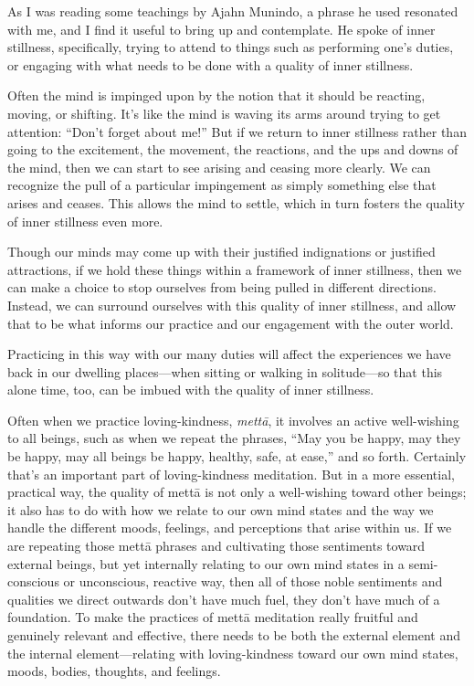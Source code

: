 
As I was reading some teachings by Ajahn Munindo, a phrase he used 
resonated with me, and I find it useful to bring up and contemplate. He 
spoke of inner stillness, specifically, trying to attend to things such 
as performing one's duties, or engaging with what needs to be done with 
a quality of inner stillness.

Often the mind is impinged upon by the notion that it should be 
reacting, moving, or shifting. It's like the mind is waving its arms 
around trying to get attention: ``Don't forget about me!'' But if we 
return to inner stillness rather than going to the excitement, the 
movement, the reactions, and the ups and downs of the mind, then we can 
start to see arising and ceasing more clearly. We can recognize the 
pull of a particular impingement as simply something else that arises 
and ceases. This allows the mind to settle, which in turn fosters the 
quality of inner stillness even more.

Though our minds may come up with their justified indignations or 
justified attractions, if we hold these things within a framework of 
inner stillness, then we can make a choice to stop ourselves from being 
pulled in different directions. Instead, we can surround ourselves with 
this quality of inner stillness, and allow that to be what informs our 
practice and our engagement with the outer world.

Practicing in this way with our many duties will affect the experiences 
we have back in our dwelling places---when sitting or walking in 
solitude---so that this alone time, too, can be imbued with the quality 
of inner stillness.


Often when we practice loving-kindness, \emph{mettā}, it involves an 
active well-wishing to all beings, such as when we repeat the phrases, 
``May you be happy, may they be happy, may all beings be happy, 
healthy, safe, at ease,'' and so forth. Certainly that's an important 
part of loving-kindness meditation. But in a more essential, practical 
way, the quality of mettā is not only a well-wishing toward other 
beings; it also has to do with how we relate to our own mind states and 
the way we handle the different moods, feelings, and perceptions that 
arise within us. If we are repeating those mettā phrases and 
cultivating those sentiments toward external beings, but yet internally 
relating to our own mind states in a semi-conscious or unconscious, 
reactive way, then all of those noble sentiments and qualities we 
direct outwards don't have much fuel, they don't have much of a 
foundation. To make the practices of mettā meditation really fruitful 
and genuinely relevant and effective, there needs to be both the 
external element and the internal element---relating with 
loving-kindness toward our own mind states, moods, bodies, thoughts, 
and feelings.

